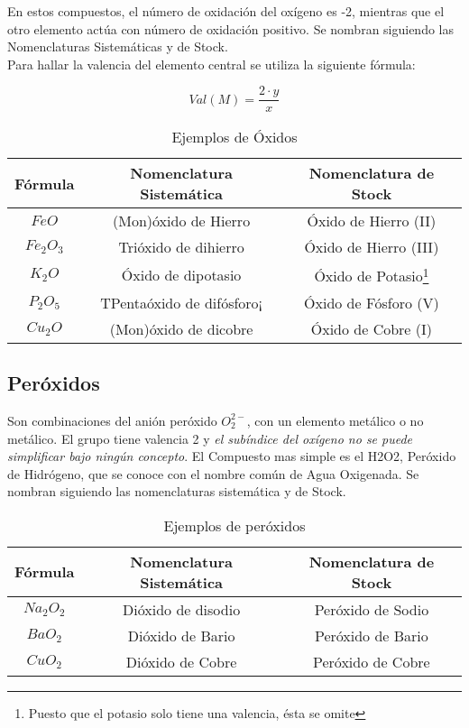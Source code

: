 En estos compuestos, el número de oxidación del oxígeno es -2, mientras que el otro elemento actúa con número de oxidación positivo. Se nombran siguiendo las Nomenclaturas Sistemáticas y de Stock.\\ 

Para hallar la valencia del elemento central se utiliza la siguiente fórmula:

\begin{equation}
	Val(M)= \frac{2\cdot y}{x}
\end{equation}

\begin{table}[h!]
	\centering
	\begin{tabular}{c|cc}
		Fórmula&Nomenclatura Sistemática&Nomenclatura de Stock\\ \hline
		$FeO$&(Mon)óxido de Hierro&Óxido de Hierro (II)\\
		$Fe_{2}O_{3}$&Trióxido de dihierro&Óxido de Hierro (III)\\
		$K_{2}O$&Óxido de dipotasio&Óxido de Potasio\footnote{Puesto que el potasio solo tiene una valencia, ésta se omite }\\
		$P_{2}O_{5}$&TPentaóxido de difósforo¡&Óxido de Fósforo (V)\\
		$Cu_{2}O$&(Mon)óxido de dicobre&Óxido de Cobre (I)\\ \hline
	\end{tabular}
	\caption{Ejemplos de Óxidos}
\end{table}

\subsection{Peróxidos}
Son combinaciones del anión peróxido $O^{2-}_2$, con un elemento metálico o no metálico. El grupo tiene valencia 2 y \emph{el subíndice del oxígeno no se puede simplificar bajo ningún concepto}. El Compuesto mas simple es el H2O2, Peróxido de Hidrógeno, que se conoce con el nombre común de Agua Oxigenada. Se nombran siguiendo las nomenclaturas sistemática y de Stock. 
\begin{table}[h!]
	\centering
	\begin{tabular}{c|cc}
		Fórmula&Nomenclatura Sistemática&Nomenclatura de Stock\\ \hline
		$Na_{2}O_{2}$&Dióxido de disodio&Peróxido de Sodio\\ 
		$BaO_{2}$&Dióxido de Bario&Peróxido de Bario\\
		$CuO_{2}$&Dióxido de Cobre&Peróxido de Cobre\\ \hline
	\end{tabular}
	\caption{Ejemplos de peróxidos}
\end{table}


